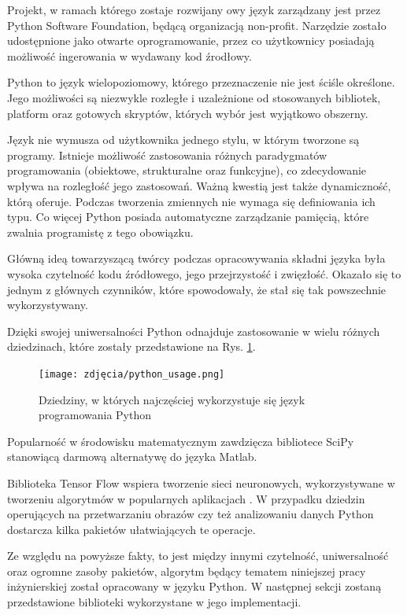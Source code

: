 Projekt, w ramach którego zostaje rozwijany owy język zarządzany jest przez Python Software Foundation, będącą organizacją non-profit. Narzędzie zostało udostępnione jako otwarte oprogramowanie, przez co użytkownicy posiadają możliwość ingerowania w wydawany kod źrodłowy.

Python to język wielopoziomowy, którego przeznaczenie nie jest ściśle określone. Jego możliwości są niezwykle rozległe i uzależnione od stosowanych bibliotek, platform oraz gotowych skryptów, których wybór jest wyjątkowo obszerny. 

Język nie wymusza od użytkownika jednego stylu, w którym tworzone są programy. Istnieje możliwość zastosowania różnych paradygmatów programowania (obiektowe, strukturalne oraz funkcyjne), co zdecydowanie wpływa na rozległość jego zastosowań. Ważną kwestią jest także dynamiczność, którą oferuje. Podczas tworzenia zmiennych nie wymaga się definiowania ich typu. Co więcej Python posiada automatyczne zarządzanie pamięcią, które zwalnia programistę z tego obowiązku. 

Główną ideą towarzyszącą twórcy podczas opracowywania składni języka była wysoka czytelność kodu źródłowego, jego przejrzystość i zwięzłość. Okazało się to jednym z głównych czynników, które spowodowały, że stał się tak powszechnie wykorzystywany.

Dzięki swojej uniwersalności Python odnajduje zastosowanie w wielu różnych dziedzinach, które zostały przedstawione na Rys. \ref{fig:pythonUsage}. 

\begin{figure}[h]
	\centering
	\texttt{[image: zdjęcia/python\_usage.png]}
	\caption{Dziedziny, w których najczęściej wykorzystuje się język programowania Python} 
	\label{fig:pythonUsage}
\end{figure}

Popularność w środowisku matematycznym zawdzięcza bibliotece SciPy stanowiącą darmową alternatywę do języka Matlab. 

Biblioteka Tensor Flow wspiera tworzenie sieci neuronowych, wykorzystywane w tworzeniu algorytmów w popularnych aplikacjach \cite{PythonApps}. W przypadku dziedzin operujących na przetwarzaniu obrazów czy też analizowaniu danych Python dostarcza kilka pakietów ułatwiających te operacje.

Ze względu na powyższe fakty, to jest między innymi czytelność, uniwersalność oraz ogromne zasoby pakietów, algorytm będący tematem niniejszej pracy inżynierskiej został opracowany w języku Python. W następnej sekcji zostaną przedstawione biblioteki wykorzystane w jego implementacji.

